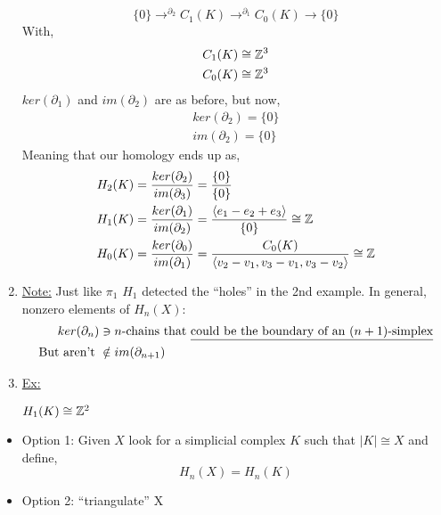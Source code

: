 \documentclass[../notes.tex]{subfiles}
\begin{document}
\begin{enumerate}
        \[
            \{0\}
            \rightarrow^{\partial_2}C_1(K)
            \rightarrow^{\partial_1}C_0(K)
            \rightarrow \{0\}
        \]
        With,
        \begin{align*}
            C_1(K)\cong \mathbb{Z}^3\\
            C_0(K)\cong \mathbb{Z}^3
        \end{align*}
        $ker(\partial_1)$ and $im(\partial_2)$ are as before, but now,
        \begin{align*}
            ker(\partial_2)=\{0\}\\
            im(\partial_2)=\{0\}
        \end{align*}
        Meaning that our homology ends up as,
        \begin{align*}
            H_2(K)&=\frac{ker(\partial_2)}{im(\partial_3)}=\frac{\{0\}}{\{0\}}\\
            H_1(K)&=\frac{ker(\partial_1)}{im(\partial_2)}=\frac{\langle e_1-e_2+e_3 \rangle}{\{0\}}
            \cong \mathbb{Z}\\
            H_0(K)&=\frac{ker(\partial_0)}{im(\partial_1)}=
            \frac{C_0(K)}{\langle v_2-v_1,v_3-v_1,v_3-v_2 \rangle}\cong \mathbb{Z}\\
        \end{align*}
    \item \underline{Note:} Just like $\pi_1$ $H_1$ detected the ``holes'' in the 2nd
        example. In general, nonzero elements of $H_n(X)$:
        \begin{align*}
            ker(\partial_n)&\ni \text{$n$-chains that \underline{could be the boundary
                    of an $(n+1)$-simplex}}\\
            \text{But aren't } &\notin im(\partial_{n+1})
        \end{align*}
    \item \underline{Ex:}
        \begin{center}
        \end{center}
        $H_1(K)\cong \mathbb{Z}^2$
\end{enumerate}
\begin{itemize}
    \item Option 1: Given $X$ look for a simplicial complex $K$ such that $|K|\cong X$
        and define,
        \[
            H_n(X)=H_n(K)
        \]
    \item Option 2: ``triangulate'' X
\end{itemize}
\end{document}
